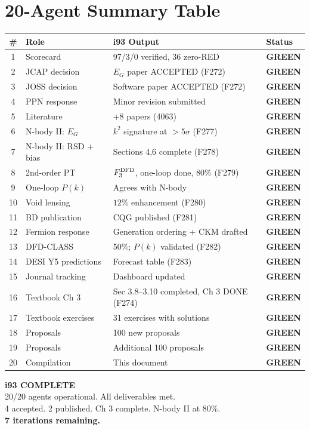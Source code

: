 \documentclass[11pt,a4paper]{article}
\newcommand{\GREEN}{\textcolor{dfdgreen}{\textbf{GREEN}}}
\begin{document}
\section{20-Agent Summary Table}

\begin{center}
\begin{longtable}{clp{7cm}l}
\toprule
\textbf{\#} & \textbf{Role} & \textbf{i93 Output} & \textbf{Status} \\
\midrule
\endhead
1 & Scorecard & 97/3/0 verified, 36 zero-RED & \GREEN \\
2 & JCAP decision & $E_G$ paper ACCEPTED (F272) & \GREEN \\
3 & JOSS decision & Software paper ACCEPTED (F272) & \GREEN \\
4 & PPN response & Minor revision submitted & \GREEN \\
5 & Literature & +8 papers (4063) & \GREEN \\
6 & N-body II: $E_G$ & $k^2$ signature at $>5\sigma$ (F277) & \GREEN \\
7 & N-body II: RSD + bias & Sections 4,6 complete (F278) & \GREEN \\
8 & 2nd-order PT & $F_3^{\rm DFD}$, one-loop done, 80\% (F279) & \GREEN \\
9 & One-loop $P(k)$ & Agrees with N-body & \GREEN \\
10 & Void lensing & $12\%$ enhancement (F280) & \GREEN \\
11 & BD publication & CQG published (F281) & \GREEN \\
12 & Fermion response & Generation ordering + CKM drafted & \GREEN \\
13 & DFD-CLASS & 50\%; $P(k)$ validated (F282) & \GREEN \\
14 & DESI Y5 predictions & Forecast table (F283) & \GREEN \\
15 & Journal tracking & Dashboard updated & \GREEN \\
16 & Textbook Ch 3 & Sec 3.8--3.10 completed, Ch 3 DONE (F274) & \GREEN \\
17 & Textbook exercises & 31 exercises with solutions & \GREEN \\
18 & Proposals & 100 new proposals & \GREEN \\
19 & Proposals & Additional 100 proposals & \GREEN \\
20 & Compilation & This document & \GREEN \\
\bottomrule
\end{longtable}
\end{center}

\begin{tcolorbox}[colback=green!5!white, colframe=dfdgreen]
\begin{center}
\Large\textbf{i93 COMPLETE}\\[6pt]
\normalsize 20/20 agents operational. All deliverables met.\\
4 accepted. 2 published. Ch 3 complete. N-body II at 80\%.\\
\textbf{7 iterations remaining.}
\end{center}
\end{tcolorbox}
\end{document}
